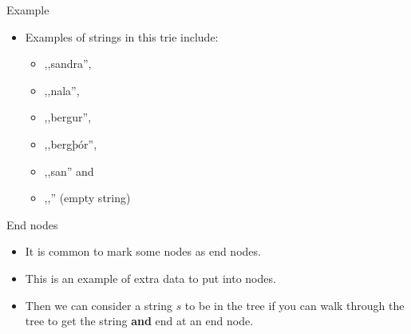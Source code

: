 \documentclass{beamer}
\begin{document}
\begin{frame}[plain]{Example}
	\begin{itemize}
        \item Examples of strings in this trie include:
		\begin{itemize}
			\item<3-> ,,sandra'',
			\item<4-> ,,nala'',
			\item<5-> ,,bergur'',
			\item<6-> ,,bergþór'',
			\item<7-> ,,san'' and
			\item<8-> ,,'' (empty string)
        \end{itemize}
    \end{itemize}
\end{frame}

\begin{frame}[plain]{End nodes}
	\begin{itemize}
        \item It is common to mark some nodes as end nodes.
        \item This is an example of extra data to put into nodes.
        \item Then we can consider a string $s$ to be in the tree if you can walk through the tree to get the string \textbf{and} end at an end node.
    \end{itemize}
\end{frame}
\end{document}

